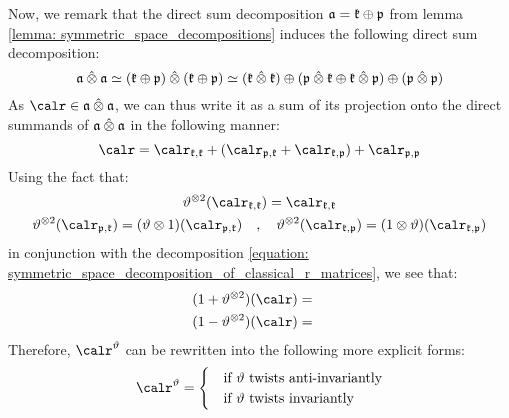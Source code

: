         Now, we remark that the direct sum decomposition $\mathfrak{a} = \mathfrak{k} \oplus \mathfrak{p}$ from lemma \ref{lemma: symmetric_space_decompositions} induces the following direct sum decomposition:
            $$\a \hattensor \a \cong (\k \oplus \p) \hattensor (\k \oplus \p) \cong (\k \hattensor \k) \oplus (\p \hattensor \k \oplus \k \hattensor \p) \oplus (\p \hattensor \p)$$
        As $\calr \in \a \hattensor \a$, we can thus write it as a sum of its projection onto the direct summands of $\a \hattensor \a$ in the following manner:
            \begin{equation} \label{equation: symmetric_space_decomposition_of_classical_r_matrices}
                \calr = \calr_{\k, \k} + ( \calr_{\p, \k} + \calr_{\k, \p} ) + \calr_{\p, \p}
            \end{equation}
        Using the fact that:
            \begin{equation}
                \begin{gathered}
                    \vartheta^{\tensor 2}(\calr_{\k, \k}) = \calr_{\k, \k}
                    \\
                    \vartheta^{\tensor 2}(\calr_{\p, \k}) = (\vartheta \tensor 1)(\calr_{\p, \k}) \quad, \quad \vartheta^{\tensor 2}(\calr_{\k, \p}) = (1 \tensor \vartheta)(\calr_{\k, \p})
                \end{gathered}
            \end{equation}
        in conjunction with the decomposition \eqref{equation: symmetric_space_decomposition_of_classical_r_matrices}, we see that:
            \begin{equation}
                \begin{gathered}
                    \begin{aligned}
                        (1 + \vartheta^{\tensor 2})(\calr) & = 
                    \end{aligned}
                    \\
                    \begin{aligned}
                        (1 - \vartheta^{\tensor 2})(\calr) & =
                    \end{aligned}
                \end{gathered}
            \end{equation}
        Therefore, $\calr^{\vartheta}$ can be rewritten into the following more explicit forms:
            $$
                \calr^{\vartheta} =
                \begin{cases}
                    & \text{if $\vartheta$ twists anti-invariantly}
                    \\
                    & \text{if $\vartheta$ twists invariantly}
                \end{cases}
            $$
            

